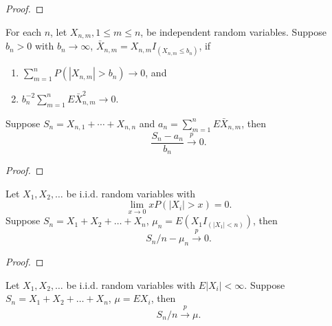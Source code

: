 \begin{proof}

\end{proof}

\begin{theorem}
    For each $n$, let $X_{n,m},1\leq m\leq n$, be independent random variables. Suppose $b_n>0$ with $b_n\rightarrow\infty$, $\bar{X}_{n,m}=X_{n,m}I_{\left(X_{n,m}\leq b_n\right)}$, if
    \begin{enumerate}
        \item $\sum_{m=1}^{n}P\left(\left|X_{n,m}\right|>b_{n}\right)\rightarrow 0$, and
        \item $b_{n}^{-2}\sum_{m=1}^{n}E\bar{X}_{n,m}^{2}\rightarrow 0$.
    \end{enumerate}
    Suppose $S_{n}=X_{n, 1}+\cdots+X_{n,n}$ and $a_{n}=\sum_{m=1}^{n}E\bar{X}_{n,m}$, then
    \begin{equation}
        \frac{S_n-a_n}{b_n}\stackrel{p}{\rightarrow}0.
    \end{equation}
\end{theorem}

\begin{proof}

\end{proof}

\begin{theorem}
    Let $X_1,X_2,\ldots$ be i.i.d. random variables with
    \begin{equation}
        \lim_{x\rightarrow 0}xP(|X_i|>x)=0.
    \end{equation}
    Suppose $S_n=X_1+X_2+\ldots+X_n$, $\mu_n=E\left(X_1I_{(|X_1|<n)}\right)$, then
    \begin{equation}
        S_n/n-\mu_n\stackrel{p}{\rightarrow}0.
    \end{equation}
\end{theorem}

\begin{proof}

\end{proof}

\begin{theorem} \label{thm:WLLN}
    Let $X_1,X_2,\ldots$ be i.i.d. random variables with $E|X_i|<\infty$. Suppose $S_n=X_1+X_2+\ldots+X_n$, $\mu=EX_i$, then
    \begin{equation}
        S_n/n\stackrel{p}{\rightarrow}\mu.
    \end{equation}
\end{theorem}

